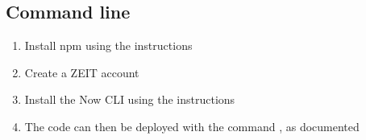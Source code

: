 \documentclass[letterpaper,10pt,english]{sphinxmanual}
\begin{document}
\subsection{Command line}
\label{\detokenize{docs/Installation/frontEnd:command-line}}\begin{enumerate}
%
\item {} 
Install npm using the instructions

\item {} 
Create a ZEIT account 

\item {} 
Install the Now CLI using the instructions

\item {} 
The code can then be deployed with the command , as documented

\end{enumerate}



\renewcommand{\indexname}{Index}
\printindex
\end{document}
